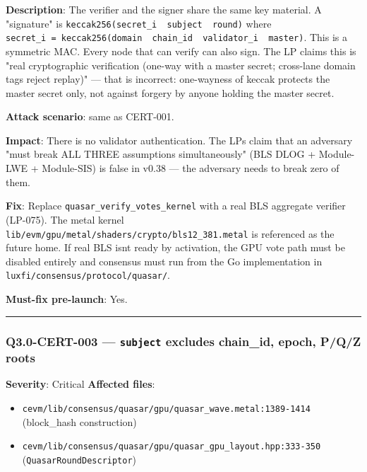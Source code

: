 \documentclass[
]{article}
\providecommand{\tightlist}{%
  \setlength{\itemsep}{0pt}\setlength{\parskip}{0pt}}
\begin{document}
\textbf{Description}: The verifier and the signer share the same key
material. A "signature" is
\texttt{keccak256(secret\_i\ \textbar{}\textbar{}\ subject\ \textbar{}\textbar{}\ round)}
where
\texttt{secret\_i\ =\ keccak256(domain\ \textbar{}\textbar{}\ chain\_id\ \textbar{}\textbar{}\ validator\_i\ \textbar{}\textbar{}\ master)}.
This is a symmetric MAC. Every node that can verify can also sign. The
LP claims this is "real cryptographic verification (one-way with a
master secret; cross-lane domain tags reject replay)" --- that is
incorrect: one-wayness of keccak protects the master secret only, not
against forgery by anyone holding the master secret.

\textbf{Attack scenario}: same as CERT-001.

\textbf{Impact}: There is no validator authentication. The
LP\textquotesingle s claim that an adversary "must break ALL THREE
assumptions simultaneously" (BLS DLOG + Module-LWE + Module-SIS) is
false in v0.38 --- the adversary needs to break zero of them.

\textbf{Fix}: Replace \texttt{quasar\_verify\_votes\_kernel} with a real
BLS aggregate verifier (LP-075). The metal kernel
\texttt{lib/evm/gpu/metal/shaders/crypto/bls12\_381.metal} is referenced
as the future home. If real BLS isn\textquotesingle t ready by
activation, the GPU vote path must be disabled entirely and consensus
must run from the Go implementation in
\texttt{luxfi/consensus/protocol/quasar/}.

\textbf{Must-fix pre-launch}: Yes.

\begin{center}\rule{0.5\linewidth}{0.5pt}\end{center}

\subsubsection{\texorpdfstring{Q3.0-CERT-003 --- \texttt{subject}
excludes chain\_id, epoch, P/Q/Z
roots}{Q3.0-CERT-003 --- subject excludes chain\_id, epoch, P/Q/Z roots}}\label{q30-cert-003--subject-excludes-chain_id-epoch-pqz-roots}

\textbf{Severity}: Critical \textbf{Affected files}:

\begin{itemize}
\tightlist
\item
  \texttt{cevm/lib/consensus/quasar/gpu/quasar\_wave.metal:1389-1414}
  (block\_hash construction)
\item
  \texttt{cevm/lib/consensus/quasar/gpu/quasar\_gpu\_layout.hpp:333-350}
  (\texttt{QuasarRoundDescriptor})
\end{itemize}
\end{document}
